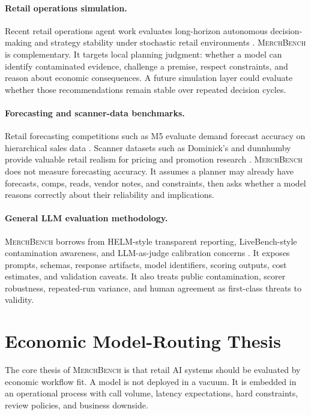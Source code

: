 \documentclass[11pt]{article}
\newcommand{\benchmark}{\textsc{MerchBench}}
\begin{document}
\paragraph{Retail operations simulation.}
Recent retail operations agent work evaluates long-horizon autonomous decision-making and strategy stability under stochastic retail environments \cite{retailopsagents}. \benchmark{} is complementary. It targets local planning judgment: whether a model can identify contaminated evidence, challenge a premise, respect constraints, and reason about economic consequences. A future simulation layer could evaluate whether those recommendations remain stable over repeated decision cycles.

\paragraph{Forecasting and scanner-data benchmarks.}
Retail forecasting competitions such as M5 evaluate demand forecast accuracy on hierarchical sales data \cite{m5accuracy, m5background}. Scanner datasets such as Dominick's and dunnhumby provide valuable retail realism for pricing and promotion research \cite{dominicks, dunnhumby}. \benchmark{} does not measure forecasting accuracy. It assumes a planner may already have forecasts, comps, reads, vendor notes, and constraints, then asks whether a model reasons correctly about their reliability and implications.

\paragraph{General LLM evaluation methodology.}
\benchmark{} borrows from HELM-style transparent reporting, LiveBench-style contamination awareness, and LLM-as-judge calibration concerns \cite{helm, livebench, mtbench}. It exposes prompts, schemas, response artifacts, model identifiers, scoring outputs, cost estimates, and validation caveats. It also treats public contamination, scorer robustness, repeated-run variance, and human agreement as first-class threats to validity.

\section{Economic Model-Routing Thesis}

The core thesis of \benchmark{} is that retail AI systems should be evaluated by economic workflow fit. A model is not deployed in a vacuum. It is embedded in an operational process with call volume, latency expectations, hard constraints, review policies, and business downside.
\end{document}
